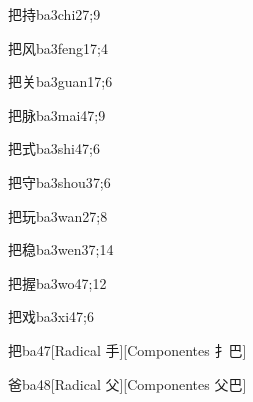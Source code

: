 \begin{verbete}{把持}{ba3chi2}{7;9}
\end{verbete}

\begin{verbete}{把风}{ba3feng1}{7;4}
\end{verbete}

\begin{verbete}{把关}{ba3guan1}{7;6}
\end{verbete}

\begin{verbete}{把脉}{ba3mai4}{7;9}
\end{verbete}

\begin{verbete}{把式}{ba3shi4}{7;6}
\end{verbete}

\begin{verbete}{把守}{ba3shou3}{7;6}
\end{verbete}

\begin{verbete}{把玩}{ba3wan2}{7;8}
\end{verbete}

\begin{verbete}{把稳}{ba3wen3}{7;14}
\end{verbete}

\begin{verbete}{把握}{ba3wo4}{7;12}
\end{verbete}

\begin{verbete}{把戏}{ba3xi4}{7;6}
\end{verbete}

\begin{verbete}{把}{ba4}{7}[Radical 手][Componentes 扌巴]
\end{verbete}

\begin{verbete}{爸}{ba4}{8}[Radical 父][Componentes 父巴]
\end{verbete}

